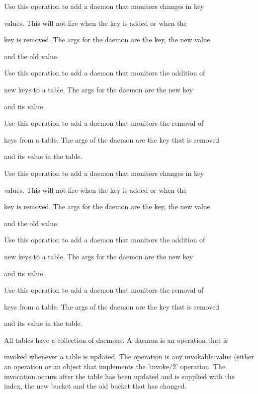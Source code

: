       Use this operation to add a daemon that monitors changes in key

      values. This will not fire when the key is added or when the

      key is removed. The args for the daemon are the key, the new value

      and the old value.

      Use this operation to add a daemon that monitors the addition of

      new keys to a table. The args for the daemon are the new key

      and its value.

      Use this operation to add a daemon that monitors the removal of

      keys from a table. The args of the daemon are the key that is removed

      and its value in the table.

      Use this operation to add a daemon that monitors changes in key

      values. This will not fire when the key is added or when the

      key is removed. The args for the daemon are the key, the new value

      and the old value.

      Use this operation to add a daemon that monitors the addition of

      new keys to a table. The args for the daemon are the new key

      and its value.

      Use this operation to add a daemon that monitors the removal of

      keys from a table. The args of the daemon are the key that is removed

      and its value in the table.

      All tables have a collection of daemons. A daemon is an operation that is

      invoked whenever a table is updated. The operation is any invokable value 
      (either an operation or an object that implements the 'invoke/2' operation. 
      The invocation occurs after the table has been updated and is supplied with 
      the index, the new bucket and the old bucket that has changed.


